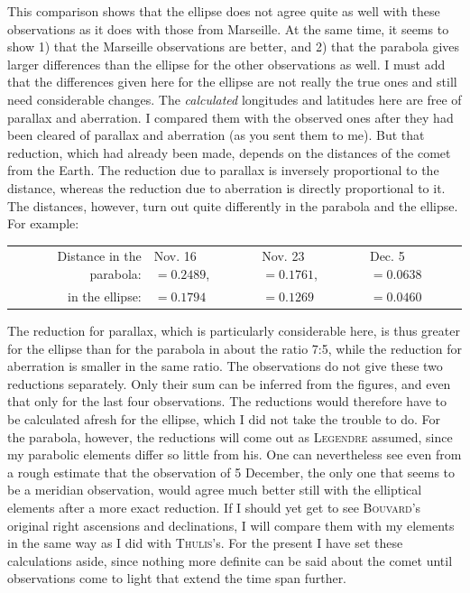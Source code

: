 \par\indent This comparison shows that the ellipse does not agree quite as well with these observations as it does with those from Marseille. At the same time, it seems to show 1) that the Marseille observations are better, and 2) that the parabola gives larger differences than the ellipse for the other observations as well. I must add that the differences given here for the ellipse are not really the true ones and still need considerable changes. The \emph{calculated} longitudes and latitudes here are free of parallax and aberration. I compared them with the observed ones after they had been cleared of parallax and aberration (as you sent them to me). But that reduction, which had already been made, depends on the distances of the comet from the Earth. The reduction due to parallax is inversely proportional to the distance, whereas the reduction due to aberration is directly proportional to it. The distances, however, turn out quite differently in the parabola and the ellipse. For example:

\begin{center}\begingroup
\fontsize{9}{11}\selectfont
\setlength{\tabcolsep}{2pt}\renewcommand{\arraystretch}{1.12}
\begin{tabular}{rlll}
Distance in the parabola: & Nov. 16 $=0.2489$, & Nov. 23 $=0.1761$, & Dec. 5 $=0.0638$ \\
in the ellipse: & $=0.1794$ & $=0.1269$ & $=0.0460$ \\
\end{tabular}\endgroup\end{center}
%
\par\indent The reduction for parallax, which is particularly considerable here, is thus greater for the ellipse than for the parabola in about the ratio 7:5, while the reduction for aberration is smaller in the same ratio. The observations do not give these two reductions separately. Only their sum can be inferred from the figures, and even that only for the last four observations. The reductions would therefore have to be calculated afresh for the ellipse, which I did not take the trouble to do. For the parabola, however, the reductions will come out as \textsc{Legendre} assumed, since my parabolic elements differ so little from his. One can nevertheless see even from a rough estimate that the observation of 5 December, the only one that seems to be a meridian observation, would agree much better still with the elliptical elements after a more exact reduction. If I should yet get to see \textsc{Bouvard}’s original right ascensions and declinations, I will compare them with my elements in the same way as I did with \textsc{Thulis}’s. For the present I have set these calculations aside, since nothing more definite can be said about the comet until observations come to light that extend the time span further.

